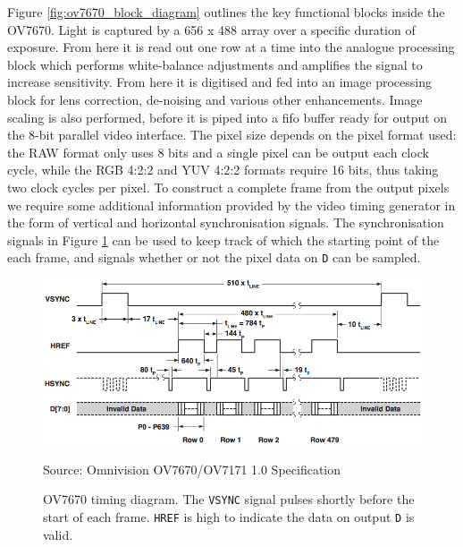 Figure \ref{fig:ov7670_block_diagram} outlines the key functional blocks inside the OV7670. Light is captured by a 656 x 488 array over a specific duration of exposure. From here it is read out one row at a time into the analogue processing block which performs white-balance adjustments and amplifies the signal to increase sensitivity. From here it is digitised and fed into an image processing block for lens correction, de-noising and various other enhancements. Image scaling is also performed, before it is piped into a \gls{fifo} buffer ready for output on the 8-bit parallel video interface. The pixel size depends on the pixel format used: the RAW format only uses 8 bits and a single pixel can be output each clock cycle, while the RGB 4:2:2 and YUV 4:2:2 formats require 16 bits, thus taking two clock cycles per pixel. To construct a complete frame from the output pixels we require some additional information provided by the video timing generator in the form of vertical and horizontal synchronisation signals. The synchronisation signals in Figure \ref{fig:ov7670_timing} can be used to keep track of which the starting point of the each frame, and signals whether or not the pixel data on \texttt{D} can be sampled. 

\begin{figure}
  \centering
  \includegraphics[width=1\textwidth]{./img/ov7670_timing.png}\par
Source: Omnivision OV7670/OV7171 1.0 Specification
  \caption{OV7670 timing diagram. The \texttt{VSYNC} signal pulses shortly before the start of each frame. \texttt{HREF} is high to indicate the data on output \texttt{D} is valid.}
  \label{fig:ov7670_timing}
\end{figure}

